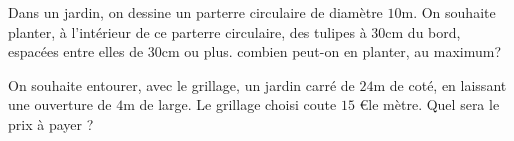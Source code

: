 \documentclass[a4paper,10pt]{report}
\begin{document}
\begin{ex}
Dans un jardin, on dessine un parterre circulaire de diamètre $10$m. On souhaite planter, à l'intérieur de ce parterre circulaire, des tulipes à $30$cm du bord, espacées entre elles de $30$cm ou plus. combien peut-on en planter, au maximum?
\end{ex}

\begin{ex}
On souhaite entourer, avec le grillage, un jardin carré de $24$m de coté, en laissant une ouverture de $4$m de large. Le grillage choisi coute $15$ \euro le mètre. Quel sera le prix à payer ?
\end{ex}
\end{document}
